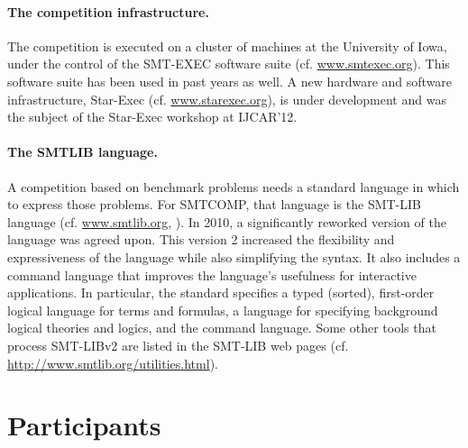 \documentclass[twosize,11pt]{article}
\begin{document}
\paragraph{The competition infrastructure.} The competition is executed on a cluster of machines at the University of Iowa, under the control of the SMT-EXEC software suite (cf. \url{www.smtexec.org}). This software suite has been used in past years as well. A new hardware and software infrastructure, Star-Exec (cf. \url{www.starexec.org}), is under development and was the subject of the Star-Exec workshop at IJCAR'12.

\paragraph{The SMTLIB language.} A competition based on benchmark problems needs a standard language in which to express those problems.
For SMTCOMP, that language is the SMT-LIB language (cf. \url{www.smtlib.org}, \cite{BarST-SMT-10} \cite{Cok-SMTLIBTutorial-2011}). 
In 2010, a significantly reworked version of the language was agreed upon.
This version 2 increased the flexibility and expressiveness of the language while also simplifying the syntax. 
It also includes a command language that improves the language's usefulness for interactive applications.
In particular, the standard specifies a typed (sorted), first-order logical language for terms and formulas, a language for specifying background logical theories and logics, and the command language. Some other tools that process SMT-LIBv2 are listed in the SMT-LIB web pages (cf. \url{http://www.smtlib.org/utilities.html}).

\section{Participants}
\label{sec:participants}
\end{document}
